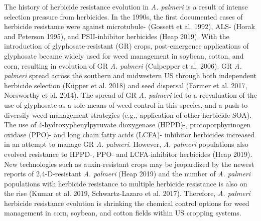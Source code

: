 \documentclass[
  12pt,
  a4paper]{article}
\begin{document}
The history of herbicide resistance evolution in \emph{A. palmeri} is a
result of intense selection pressure from herbicides. In the 1990s, the
first documented cases of herbicide resistance were against microtubule-
(Gossett et al. 1992), ALS- (Horak and Peterson 1995), and
PSII-inhibitor herbicides (Heap 2019). With the introduction of
glyphosate-resistant (GR) crops, post-emergence applications of
glyphosate became widely used for weed management in soybean, cotton,
and corn, resulting in evolution of GR \emph{A. palmeri} (Culpepper et
al. 2006). GR \emph{A. palmeri} spread across the southern and
midwestern US through both independent herbicide selection (Küpper et
al. 2018) and seed dispersal (Farmer et al. 2017, Norsworthy et al.
2014). The spread of GR \emph{A. palmeri} led to a reevaluation of the
use of glyphosate as a sole means of weed control in this species, and a
push to diversify weed management strategies (e.g., application of other
herbicide SOA). The use of 4-hydroxyphenylpyruvate dioxygenase (HPPD)-,
protoporphyrinogen oxidase (PPO)- and long chain fatty acids (LCFA)-
inhibitor herbicides increased in an attempt to manage GR \emph{A.
palmeri}. However, \emph{A. palmeri} populations also evolved resistance
to HPPD-, PPO- and LCFA-inhibitor herbicides (Heap 2019). New
technologies such as auxin-resistant crops may be jeopardized by the
newest reports of 2,4-D-resistant \emph{A. palmeri} (Heap 2019) and the
number of \emph{A. palmeri} populations with herbicide resistance to
multiple herbicide resistance is also on the rise (Kumar et al. 2019,
Schwartz-Lazaro et al. 2017). Therefore, \emph{A. palmeri} herbicide
resistance evolution is shrinking the chemical control options for weed
management in corn, soybean, and cotton fields within US cropping
systems.
\end{document}
